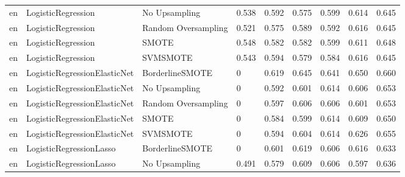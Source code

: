 \begin{tabular}{lllllllll}
      en &           LogisticRegression &       No Upsampling &     0.538 &                     0.592 &                 0.575 &                  0.599 &                                   0.614 &     0.645 \\
      en &           LogisticRegression & Random Oversampling &     0.521 &                     0.575 &                 0.589 &                  0.592 &                                   0.616 &     0.645 \\
      en &           LogisticRegression &               SMOTE &     0.548 &                     0.582 &                 0.582 &                  0.599 &                                   0.611 &     0.648 \\
      en &           LogisticRegression &            SVMSMOTE &     0.543 &                     0.594 &                 0.579 &                  0.584 &                                   0.616 &     0.645 \\
      en & LogisticRegressionElasticNet &     BorderlineSMOTE &         0 &                     0.619 &                 0.645 &                  0.641 &                                   0.650 &     0.660 \\
      en & LogisticRegressionElasticNet &       No Upsampling &         0 &                     0.592 &                 0.601 &                  0.614 &                                   0.606 &     0.653 \\
      en & LogisticRegressionElasticNet & Random Oversampling &         0 &                     0.597 &                 0.606 &                  0.606 &                                   0.601 &     0.653 \\
      en & LogisticRegressionElasticNet &               SMOTE &         0 &                     0.584 &                 0.599 &                  0.614 &                                   0.609 &     0.650 \\
      en & LogisticRegressionElasticNet &            SVMSMOTE &         0 &                     0.594 &                 0.604 &                  0.614 &                                   0.626 &     0.655 \\
      en &      LogisticRegressionLasso &     BorderlineSMOTE &         0 &                     0.601 &                 0.619 &                  0.606 &                                   0.616 &     0.633 \\
      en &      LogisticRegressionLasso &       No Upsampling &     0.491 &                     0.579 &                 0.609 &                  0.606 &                                   0.597 &     0.636 \\

\end{tabular}
